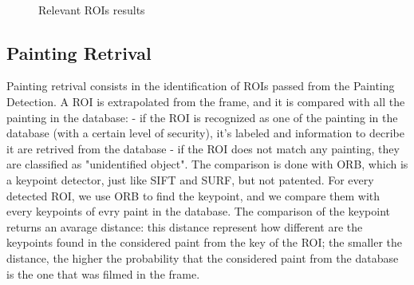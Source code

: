 \documentclass[10pt,twocolumn,letterpaper]{article}
\begin{document}
\begin{figure}
    \\
    \caption{Relevant ROIs results}
    \label{fig:foobar}
\end{figure}

\subsection{Painting Retrival}
Painting retrival consists in the identification of ROIs passed from the Painting Detection. A ROI is extrapolated from the frame, and it is compared with all the painting in the database:
	- if the ROI is recognized as one of the painting in the database (with a certain level of security), it's labeled and information to decribe it are retrived from the database
	- if the ROI does not match any painting,  they are classified as "unidentified object".
The comparison is done with ORB, which is a keypoint detector, just like SIFT and SURF, but not patented.
For every detected ROI, we use ORB to find the keypoint, and we compare them with every keypoints of evry paint in the database.
The comparison of the keypoint returns an avarage distance: this distance represent how different are the keypoints found in the considered paint from the key of the ROI; the smaller the distance, the higher the probability that the considered paint from the database is the one that was filmed in the frame.
\end{document}
